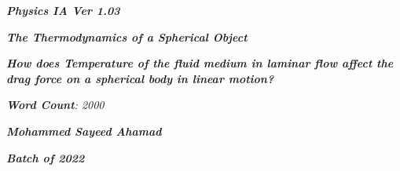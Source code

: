 

\begin{titlepage}
    \begin{center}
        \vspace*{1cm}
            
        \date{}
            
        \huge
            
        \textit{\textbf{Physics IA Ver 1.03}}
            
        \vspace{0.25cm}
            
        \hline
            
        \vspace{2.5cm}
            
        \textit{\textbf{The Thermodynamics of a Spherical Object}}
            
        \vspace{1cm}
            
        \LARGE
            
        \textit{\textbf{How does Temperature of the fluid medium in laminar flow affect the drag force on a spherical body in linear motion? }}
            
        \vspace{2.5cm}
            
        \Large
            
		\textit{\textbf{Word Count}: 2000}            

		\vspace{1cm}            
            
		\Large		
		            
        \textit{\textbf{Mohammed Sayeed Ahamad}}
            
        \vspace{2cm}
            
        \Large
            
        \textit{\textbf{Batch of 2022}}
            
        \vspace{0.25cm}
            
        \hline
           
            
    \end{center}
\end{titlepage}





